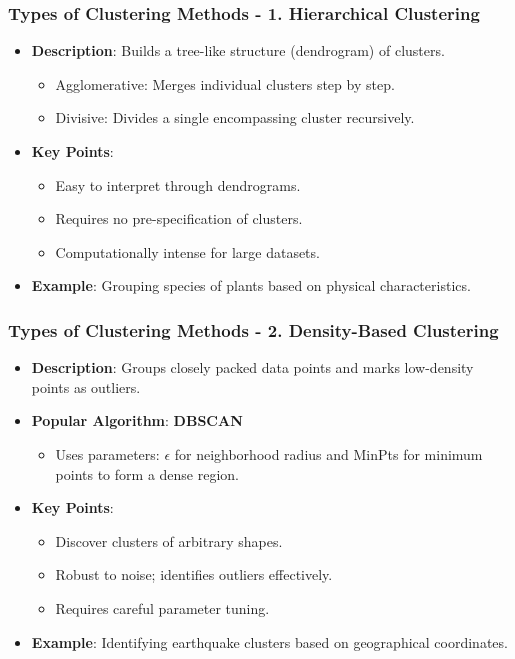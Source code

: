 \documentclass{beamer}
\begin{document}
\begin{frame}[fragile]
    \frametitle{Types of Clustering Methods - 1. Hierarchical Clustering}
    \begin{itemize}
        \item \textbf{Description}: Builds a tree-like structure (dendrogram) of clusters.
        \begin{itemize}
            \item Agglomerative: Merges individual clusters step by step.
            \item Divisive: Divides a single encompassing cluster recursively.
        \end{itemize}
        \item \textbf{Key Points}:
        \begin{itemize}
            \item Easy to interpret through dendrograms.
            \item Requires no pre-specification of clusters.
            \item Computationally intense for large datasets.
        \end{itemize}
        \item \textbf{Example}: Grouping species of plants based on physical characteristics.
    \end{itemize}
\end{frame}

\begin{frame}[fragile]
    \frametitle{Types of Clustering Methods - 2. Density-Based Clustering}
    \begin{itemize}
        \item \textbf{Description}: Groups closely packed data points and marks low-density points as outliers.
        \item \textbf{Popular Algorithm}: \textbf{DBSCAN}
        \begin{itemize}
            \item Uses parameters: $\epsilon$ for neighborhood radius and MinPts for minimum points to form a dense region.
        \end{itemize}
        \item \textbf{Key Points}:
        \begin{itemize}
            \item Discover clusters of arbitrary shapes.
            \item Robust to noise; identifies outliers effectively.
            \item Requires careful parameter tuning.
        \end{itemize}
        \item \textbf{Example}: Identifying earthquake clusters based on geographical coordinates.
    \end{itemize}
\end{frame}
\end{document}
